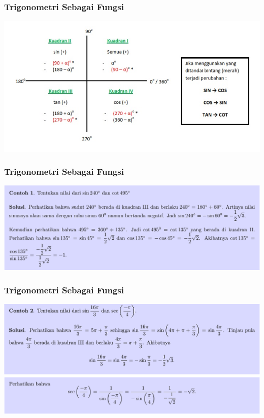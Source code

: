 \documentclass[pdflatex,compress,mathserif]{beamer}
\begin{document}
\begin{frame}
	\frametitle{Trigonometri Sebagai Fungsi}
	\begin{center}
		\includegraphics[width=\linewidth]{img/img05a}
	\end{center}
\end{frame}

\begin{frame}
	\frametitle{Trigonometri Sebagai Fungsi}
	\begin{center}
		\includegraphics[width=\linewidth]{img/img06}
	\end{center}
\end{frame}

\begin{frame}
	\frametitle{Trigonometri Sebagai Fungsi}
	\begin{center}
		\includegraphics[width=\linewidth]{img/img07}
		\includegraphics[width=\linewidth]{img/img08}
	\end{center}
\end{frame}
\end{document}
